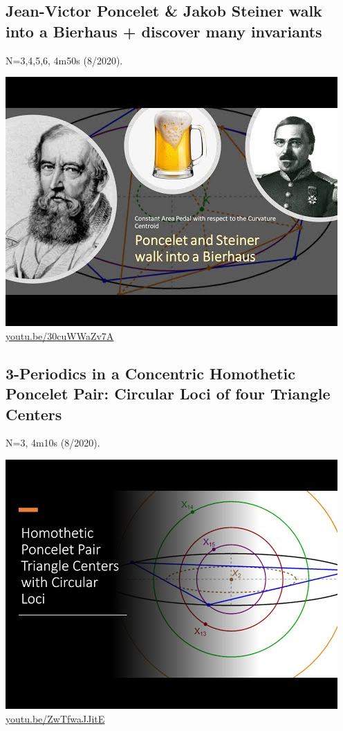 \documentclass[12pt]{amsart}
\begin{document}
\subsection{Jean-Victor Poncelet \& Jakob Steiner walk into a Bierhaus + discover many invariants}
\label{vid:30cuWWaZv7A}
\noindent N=3,4,5,6, 4m50s (8/2020). 
\begin{center}\includegraphics[width=.5\textwidth]{pics/30cuWWaZv7A.jpg} \\ 
\href{https://youtu.be/30cuWWaZv7A}{\url{youtu.be/30cuWWaZv7A}}\end{center}
% 

\subsection{3-Periodics in a Concentric Homothetic Poncelet Pair: Circular Loci of four Triangle Centers}
\label{vid:ZwTfwaJJitE}
\noindent N=3, 4m10s (8/2020). 
\begin{center}\includegraphics[width=.5\textwidth]{pics/ZwTfwaJJitE.jpg} \\ 
\href{https://youtu.be/ZwTfwaJJitE}{\url{youtu.be/ZwTfwaJJitE}}\end{center}
% 
\end{document}

